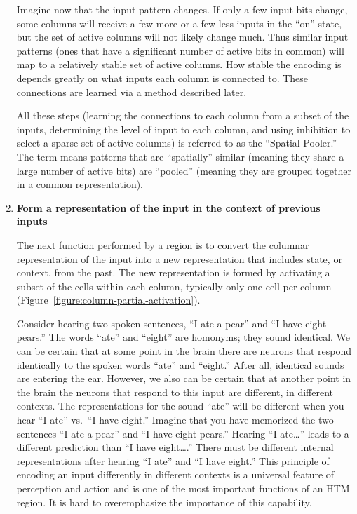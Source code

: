 \documentclass{report}
\begin{document}
\begin{enumerate}
Imagine now that the input pattern changes. If only a few input bits
change, some columns will receive a few more or a few less inputs in
the ``on'' state, but the set of active columns will not likely change
much. Thus similar input patterns (ones that have a significant number
of active bits in common) will map to a relatively stable set of
active columns. How stable the encoding is depends greatly on what
inputs each column is connected to. These connections are learned via
a method described later.

All these steps (learning the connections to each column from a subset
of the inputs, determining the level of input to each column, and
using inhibition to select a sparse set of active columns) is referred
to as the ``Spatial Pooler.'' The term means patterns that are
``spatially'' similar (meaning they share a large number of active
bits) are ``pooled'' (meaning they are grouped together in a common
representation).

\item {\bf Form a representation of the input in the context of
  previous inputs}

The next function performed by a region is to convert the columnar
representation of the input into a new representation that includes
state, or context, from the past. The new representation is formed by
activating a subset of the cells within each column, typically only
one cell per column (Figure~\ref{figure:column-partial-activation}).

Consider hearing two spoken sentences, ``I ate a pear'' and ``I have
eight pears.'' The words ``ate'' and ``eight'' are homonyms; they
sound identical. We can be certain that at some point in the brain
there are neurons that respond identically to the spoken words ``ate''
and ``eight.'' After all, identical sounds are entering the
ear. However, we also can be certain that at another point in the
brain the neurons that respond to this input are different, in
different contexts. The representations for the sound ``ate'' will be
different when you hear ``I ate'' vs.\ ``I have eight.'' Imagine that
you have memorized the two sentences ``I ate a pear'' and ``I have
eight pears.'' Hearing ``I ate\dots'' leads to a different prediction
than ``I have eight\dots.'' There must be different internal
representations after hearing ``I ate'' and ``I have eight.'' This
principle of encoding an input differently in different contexts is a
universal feature of perception and action and is one of the most
important functions of an HTM region. It is hard to overemphasize the
importance of this capability.


\end{enumerate}
\end{document}
